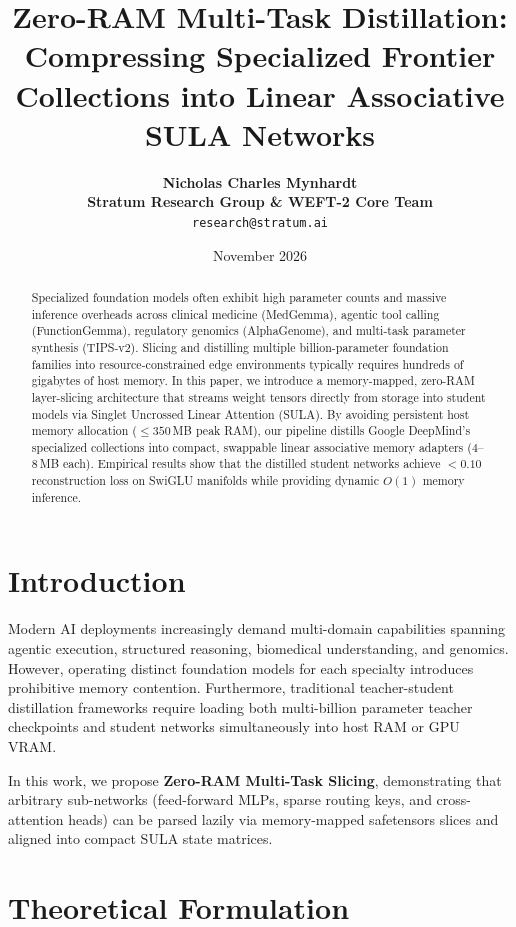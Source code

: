 \documentclass[11pt,a4paper]{article}
\title{\textbf{Zero-RAM Multi-Task Distillation: Compressing Specialized Frontier Collections into Linear Associative SULA Networks}}
\author{
  \textbf{Nicholas Charles Mynhardt} \\
  \textbf{Stratum Research Group \& WEFT-2 Core Team} \\
  \texttt{research@stratum.ai}
}
\date{November 2026}
\begin{document}
\maketitle

\begin{abstract}
Specialized foundation models often exhibit high parameter counts and massive inference overheads across clinical medicine (MedGemma), agentic tool calling (FunctionGemma), regulatory genomics (AlphaGenome), and multi-task parameter synthesis (TIPS-v2). Slicing and distilling multiple billion-parameter foundation families into resource-constrained edge environments typically requires hundreds of gigabytes of host memory. In this paper, we introduce a memory-mapped, zero-RAM layer-slicing architecture that streams weight tensors directly from storage into student models via Singlet Uncrossed Linear Attention (SULA). By avoiding persistent host memory allocation ($\le 350$\,MB peak RAM), our pipeline distills Google DeepMind's specialized collections into compact, swappable linear associative memory adapters ($4$--$8$\,MB each). Empirical results show that the distilled student networks achieve $<0.10$ reconstruction loss on SwiGLU manifolds while providing dynamic $O(1)$ memory inference.
\end{abstract}

\section{Introduction}
Modern AI deployments increasingly demand multi-domain capabilities spanning agentic execution, structured reasoning, biomedical understanding, and genomics. However, operating distinct foundation models for each specialty introduces prohibitive memory contention. Furthermore, traditional teacher-student distillation frameworks require loading both multi-billion parameter teacher checkpoints and student networks simultaneously into host RAM or GPU VRAM.

In this work, we propose \textbf{Zero-RAM Multi-Task Slicing}, demonstrating that arbitrary sub-networks (feed-forward MLPs, sparse routing keys, and cross-attention heads) can be parsed lazily via memory-mapped safetensors slices and aligned into compact SULA state matrices.

\section{Theoretical Formulation}
\end{document}
